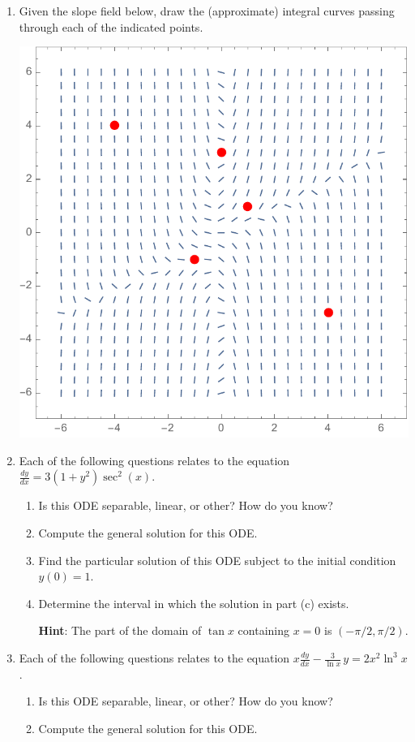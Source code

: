 \documentclass[12 pt]{article}
\newcommand{\hint}[1]{\vspace{3mm}\textbf{Hint}: #1}
\begin{document}
\begin{enumerate}[leftmargin=0in, rightmargin=-0.25in]
	\item Given the slope field below, draw the (approximate) integral curves passing through each of the indicated points.
	\begin{center}
		\includegraphics[scale=0.875]{hw1_slopes}
	\end{center}

	\newpage
	
	\item Each of the following questions relates to the equation $\frac{dy}{dx}=3(1+y^2)\sec^2(x)$.
	\begin{enumerate}[itemsep=1.75in]
		\item Is this ODE separable, linear, or other? How do you know?
		\item Compute the general solution for this ODE.
		\item Find the particular solution of this ODE subject to the initial condition $y(0)=1$.
		\item Determine the interval in which the solution in part (c) exists.
		
		\hint{The part of the domain of $\tan{x}$ containing $x=0$ is $(-\pi/2,\pi/2)$.}
	\end{enumerate}

	\newpage
	
	\item Each of the following questions relates to the equation $x\frac{dy}{dx}-\frac{3}{\ln{x}}\,y=2x^2\ln^3{x}$.
	\begin{enumerate}[itemsep=1.75in]
		\item Is this ODE separable, linear, or other? How do you know?
		\item Compute the general solution for this ODE. 
		

\end{enumerate}
\end{enumerate}
\end{document}
